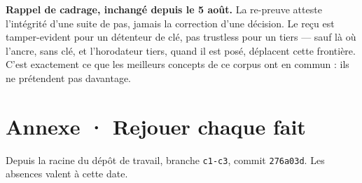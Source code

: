 \documentclass[10pt]{article}
\newcommand{\code}[1]{\texttt{\small #1}}
\begin{document}
\begin{these}
\textbf{Rappel de cadrage, inchangé depuis le 5 août.} La re-preuve atteste l'intégrité d'une suite de pas, jamais la
correction d'une décision. Le reçu est tamper-evident pour un détenteur de clé, pas trustless pour un tiers --- sauf
là où l'ancre, sans clé, et l'horodateur tiers, quand il est posé, déplacent cette frontière. C'est exactement ce que
les meilleurs concepts de ce corpus ont en commun : ils ne prétendent pas davantage.
\end{these}

\section{Annexe · Rejouer chaque fait}

Depuis la racine du dépôt de travail, branche \code{c1-c3}, commit \code{276a03d}. Les absences valent à cette date.
\end{document}
